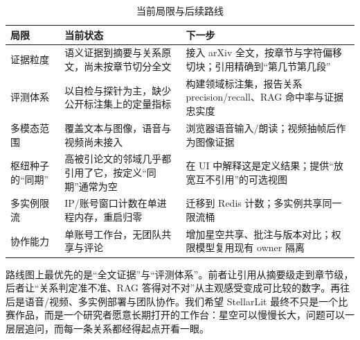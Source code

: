 \begin{table}[htbp]
  \centering
  \small
  \caption{当前局限与后续路线}
  \label{tab:future}
  \begin{tabularx}{\textwidth}{L{2.8cm}L{5.6cm}Y}
    \toprule
\textbf{局限} & \textbf{当前状态} & \textbf{下一步} \\
    \midrule
    证据粒度 & 语义证据到摘要与关系原文，尚未按章节切分全文 & 接入 arXiv 全文，按章节与字符偏移切块；引用精确到“第几节第几段” \\
    评测体系 & 以自检与探针为主，缺少公开标注集上的定量指标 & 构建领域标注集，报告关系 precision/recall、RAG 命中率与证据忠实度 \\
    多模态范围 & 覆盖文本与图像，语音与视频尚未接入 & 浏览器语音输入/朗读；视频抽帧后作为图像证据 \\
    枢纽种子的“同期” & 高被引论文的邻域几乎都引用了它，按定义“同期”通常为空 & 在 UI 中解释这是定义结果；提供“放宽互不引用”的可选视图 \\
    多实例限流 & IP/账号窗口计数在单进程内存，重启归零 & 迁移到 Redis 计数；多实例共享同一限流桶 \\
    协作能力 & 单账号工作台，无团队共享与评论 & 增加星空共享、批注与版本对比；权限模型复用现有 owner 隔离 \\
    \bottomrule
  \end{tabularx}
\end{table}

路线图上最优先的是“全文证据”与“评测体系”。前者让引用从摘要级走到章节级，后者让“关系判定准不准、RAG 答得对不对”从主观感受变成可比较的数字。再往后是语音/视频、多实例部署与团队协作。我们希望 StellarLit 最终不只是一个比赛作品，而是一个研究者愿意长期打开的工作台：星空可以慢慢长大，问题可以一层层追问，而每一条关系都经得起点开看一眼。
